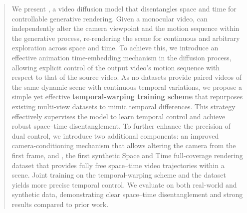 \begin{abstract}



We present \textbf{\nameMethod}, a video diffusion model that disentangles space and time for controllable generative rendering. Given a monocular video, \textbf{\nameMethod} can independently alter the camera viewpoint and the motion sequence within the generative process, re-rendering the scene for continuous and arbitrary exploration across space and time.
To achieve this, we introduce an effective animation time-embedding mechanism in the diffusion process, allowing explicit control of the output video’s motion sequence with respect to that of the source video. As no datasets provide paired videos of the same dynamic scene with continuous temporal variations, we propose a simple yet effective \textbf{temporal-warping training scheme} that repurposes existing multi-view datasets to mimic temporal differences. This strategy effectively supervises the model to learn temporal control and achieve robust space–time disentanglement. 
To further enhance the precision of dual control, we introduce two additional components: an improved camera-conditioning mechanism that allows altering the camera from the first frame, and \nameDataset, the first synthetic Space and Time full-coverage rendering dataset that provides fully free space–time video trajectories within a scene. Joint training on the temporal-warping scheme and the \nameDataset dataset yields more precise temporal control.
We evaluate \textbf{\nameMethod} on both real-world and synthetic data, demonstrating clear space–time disentanglement and strong results compared to prior work.
\end{abstract}
